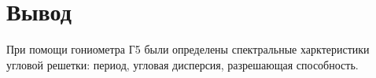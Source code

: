 \section{Вывод}
При помощи гониометра Г5 были определены спектральные харктеристики угловой решетки: период, угловая дисперсия, разрешающая способность.
